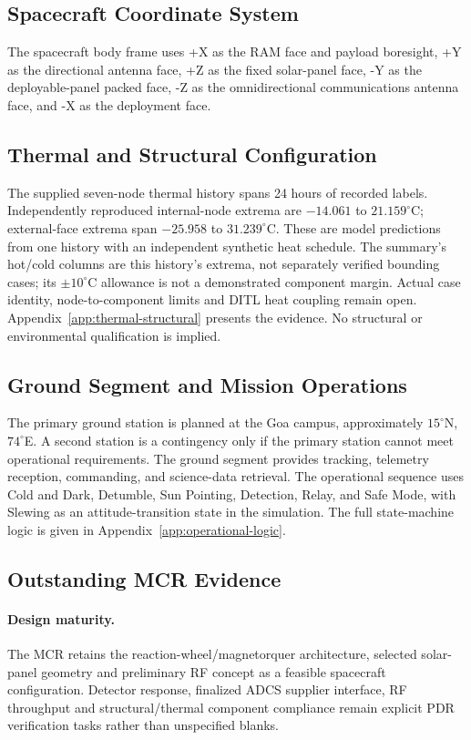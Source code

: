 \subsection{Spacecraft Coordinate System}\label{spacecraft-coordinate-system}
The spacecraft body frame uses +X as the RAM face and payload boresight, +Y as the directional antenna face, +Z as the fixed solar-panel face, -Y as the deployable-panel packed face, -Z as the omnidirectional communications antenna face, and -X as the deployment face.

\subsection{Thermal and Structural Configuration}\label{sec:thermal-architecture}
The supplied seven-node thermal history spans 24 hours of recorded labels. Independently reproduced internal-node extrema are $-14.061$ to $21.159^\circ$C; external-face extrema span $-25.958$ to $31.239^\circ$C. These are model predictions from one history with an independent synthetic heat schedule. The summary's hot/cold columns are this history's extrema, not separately verified bounding cases; its $\pm10^\circ$C allowance is not a demonstrated component margin. Actual case identity, node-to-component limits and DITL heat coupling remain open. Appendix~\ref{app:thermal-structural} presents the evidence. No structural or environmental qualification is implied.

\subsection{Ground Segment and Mission Operations}\label{ground-segment-mission-operations}
The primary ground station is planned at the Goa campus, approximately $15^\circ$N, $74^\circ$E. A second station is a contingency only if the primary station cannot meet operational requirements. The ground segment provides tracking, telemetry reception, commanding, and science-data retrieval. The operational sequence uses Cold and Dark, Detumble, Sun Pointing, Detection, Relay, and Safe Mode, with Slewing as an attitude-transition state in the simulation. The full state-machine logic is given in Appendix~\ref{app:operational-logic}.

\subsection{Outstanding MCR Evidence}
\paragraph{Design maturity.} The MCR retains the reaction-wheel/magnetorquer architecture, selected solar-panel geometry and preliminary RF concept as a feasible spacecraft configuration. Detector response, finalized ADCS supplier interface, RF throughput and structural/thermal component compliance remain explicit PDR verification tasks rather than unspecified blanks.

